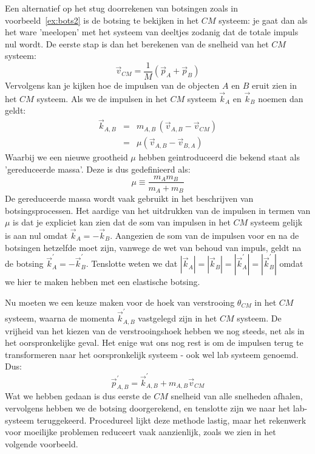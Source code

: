 Een alternatief op het stug doorrekenen van botsingen zoals in voorbeeld~\ref{ex:bots2} is de botsing te bekijken in 
het $CM$ systeem: je gaat dan als het ware 'meelopen' met het systeem van deeltjes zodanig dat de totale impuls
nul wordt. De eerste stap is dan het  berekenen van de snelheid van het $CM$ systeem:
\begin{equation}
\vec{v}_{CM} = \frac{1}{M}(\vec{p}_A + \vec{p}_B)
\end{equation}
Vervolgens kan je kijken hoe de impulsen van de objecten $A$ en $B$ eruit zien in het $CM$ systeem. Als we de
impulsen in het $CM$ systeem $\vec{k}_A$ en $\vec{k}_B$ noemen dan geldt:
\begin{eqnarray}
\vec{k}_{A,B} & = & m_{A,B}\,(\vec{v}_{A,B}-\vec{v}_{CM}) \\
                        & = & \mu (\vec{v}_{A,B} - \vec{v}_{B,A}) 
\end{eqnarray}
Waarbij we een nieuwe grootheid $\mu$ hebben geintroduceerd die bekend staat als 'gereduceerde massa'. Deze
is dus gedefinieerd als:
\begin{equation}
\mu \equiv \frac{m_A m_B}{m_A + m_B}
\end{equation}
De gereduceerde massa wordt vaak gebruikt in het beschrijven van botsingsprocessen. Het aardige van het
uitdrukken van de impulsen in termen van $\mu$ is dat je expliciet kan zien dat de som van impulsen in het
$CM$ systeem gelijk is aan nul omdat $\vec{k}_A=-\vec{k}_B$. Aangezien de som van de impulsen voor en na
de botsingen hetzelfde moet zijn, vanwege de wet van behoud van impuls, geldt na de botsing 
$\vec{k}_A^{\prime}=-\vec{k}_B^{\prime}$. Tenslotte weten we dat $|\vec{k}_A|=|\vec{k}_B|=|\vec{k}_A^{\prime}|=|\vec{k}_B^{\prime}|$
omdat we hier te maken hebben met een elastische botsing. 

Nu moeten we een keuze maken voor de hoek van verstrooing $\theta_{CM}$ in het $CM$ systeem, waarna
de momenta $\vec{k}_{A,B}^{\prime}$ vastgelegd zijn in het $CM$ systeem. De vrijheid van het kiezen van de verstrooingshoek
hebben we nog steeds, net als in het oorspronkelijke geval. Het enige wat ons nog rest is om de impulsen terug te 
transformeren naar het oorspronkelijk systeem - ook wel lab systeem genoemd. Dus:
\begin{equation}\label{eq:naarlab}
\vec{p}_{A,B}^{\prime} = \vec{k}_{A,B}^{\prime} + m_{A,B} \vec{v}_{CM}
\end{equation}
Wat we hebben gedaan is dus eerste de $CM$ snelheid van alle snelheden afhalen, vervolgens hebben we 
de botsing doorgerekend, en tenslotte zijn we naar het lab-systeem teruggekeerd. Procedureel lijkt deze methode 
lastig, maar het rekenwerk voor moeilijke problemen reduceert vaak aanzienlijk, zoals we zien in het volgende 
voorbeeld.

